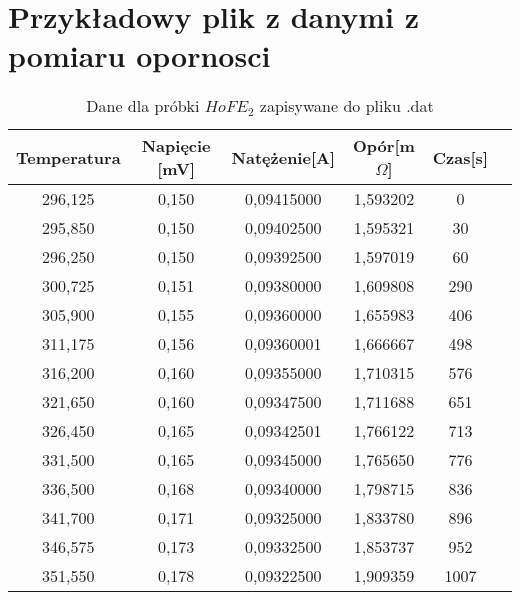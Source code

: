 \documentclass[a4paper,12pt]{article}
\numberwithin{equation}{section}
\begin{document}
\begin{appendices}
\begin{longtable}[c]{|c|c|c|c|c|c|c|}
 \end{longtable}

\clearpage
 \section{Przykładowy plik z danymi z pomiaru opornosci}


  \label{plik}
  \scriptsize
  \begin{longtable}[c]{|c|c|c|c|c|c|}
\caption{Dane dla próbki $HoFE_{2}$ zapisywane do pliku .dat}\\
  \hline
 Temperatura 	&	 Napięcie [mV] 	&	 Natężenie[A] 	&	 Opór[m$\Omega$]  &   Czas[s] \\\hline\hline
296,125	&	 		0,150	&	 		0,09415000		 	&	1,593202	&	 		0		\\\hline
295,850	&	 		0,150	&	 		0,09402500		 	&	1,595321	&	 		30		\\\hline
296,250	&	 		0,150	&	 		0,09392500		 	&	1,597019	&	 		60		\\\hline
300,725	&	 		0,151	&	 		0,09380000		 	&	1,609808	&	 		290		\\\hline
305,900	&	 		0,155	&	 		0,09360000		 	&	1,655983	&	 		406		\\\hline
311,175	&	 		0,156	&	 		0,09360001		 	&	1,666667	&	 		498		\\\hline
316,200	&	 		0,160	&	 		0,09355000		 	&	1,710315	&	 		576		\\\hline
321,650	&	 		0,160	&	 		0,09347500		 	&	1,711688	&	 		651		\\\hline
326,450	&	 		0,165	&	 		0,09342501		 	&	1,766122	&	 		713		\\\hline
331,500	&	 		0,165	&	 		0,09345000		 	&	1,765650	&	 		776		\\\hline
336,500	&	 		0,168	&	 		0,09340000		 	&	1,798715	&	 		836		\\\hline
341,700	&	 		0,171	&	 		0,09325000		 	&	1,833780	&	 		896		\\\hline
346,575	&	 		0,173	&	 		0,09332500		 	&	1,853737	&	 		952		\\\hline
351,550	&	 		0,178	&	 		0,09322500		 	&	1,909359	&	 		1007		\\\hline

\end{longtable}
\end{appendices}
\end{document}
